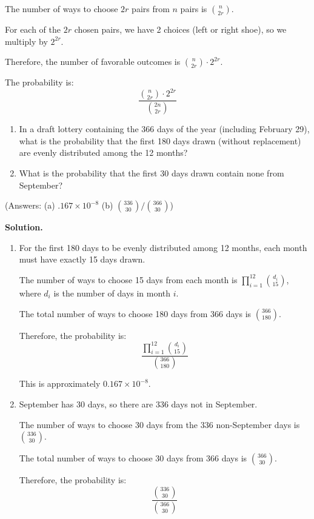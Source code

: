 The number of ways to choose $2r$ pairs from $n$ pairs is $\binom{n}{2r}$.

For each of the $2r$ chosen pairs, we have 2 choices (left or right shoe), so we multiply by $2^{2r}$.

Therefore, the number of favorable outcomes is $\binom{n}{2r} \cdot 2^{2r}$.

The probability is:
\[ \frac{\binom{n}{2r} \cdot 2^{2r}}{\binom{2n}{2r}} \]


\begin{problembox}
\begin{enumerate}[label=(\alph*)]
    \item In a draft lottery containing the 366 days of the year (including February 29), what is the probability that the first 180 days drawn (without replacement) are evenly distributed among the 12 months?
    \item What is the probability that the first 30 days drawn contain none from September?
\end{enumerate}
(Answers: (a) $.167\times 10^{-8}$ (b) $\binom{336}{30}/\binom{366}{30}$)
\end{problembox}

\noindent\textbf{Solution.}
\begin{enumerate}[label=(\alph*)]
    \item For the first 180 days to be evenly distributed among 12 months, each month must have exactly 15 days drawn.
    
    The number of ways to choose 15 days from each month is $\prod_{i=1}^{12} \binom{d_i}{15}$, where $d_i$ is the number of days in month $i$.
    
    The total number of ways to choose 180 days from 366 days is $\binom{366}{180}$.
    
    Therefore, the probability is:
    \[ \frac{\prod_{i=1}^{12} \binom{d_i}{15}}{\binom{366}{180}} \]
    
    This is approximately $0.167 \times 10^{-8}$.
    
    \item September has 30 days, so there are 336 days not in September.
    
    The number of ways to choose 30 days from the 336 non-September days is $\binom{336}{30}$.
    
    The total number of ways to choose 30 days from 366 days is $\binom{366}{30}$.
    
    Therefore, the probability is:
    \[ \frac{\binom{336}{30}}{\binom{366}{30}} \]
\end{enumerate}


